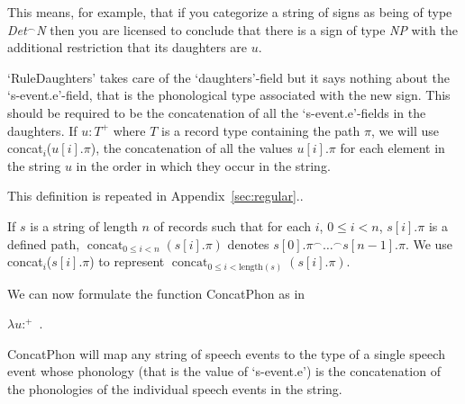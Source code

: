 
\begin{ex}
  \begin{prooftree}
  \end{prooftree}
  
\end{ex} 
This means, for example, that if you categorize a string of signs as
being of type \textit{Det}$^{\frown}$\textit{N} then you are licensed to conclude
that there is a sign of type \textit{NP} with the additional
restriction that its daughters are $u$.   

`RuleDaughters' takes care of the `daughters'-field but it says
nothing about the `s-event.e'-field, that is the phonological type
associated with the new sign.  This should be required to be the
concatenation of all the `s-event.e'-fields in the daughters. If
$u:T^+$ where $T$ is a record type containing the path $\pi$, we will
use concat$_i$($u[i].\pi$),
the concatenation of all the values $u[i].\pi$ for each element in the
string $u$ in the order in which they occur in the string.

\begin{shaded}
This
definition is repeated in
Appendix~\ref{sec:regular}.\label{pg:concat-i}.

If $s$ is a string of length $n$ of records such that for each $i$,
$0\leq i<n$, $s[i].\pi$ is a defined path, 
$\displaystyle\mathop{\mathrm{concat}}_{0\leq i<n}(s[i].\pi)$ denotes
$s[0].\pi^{\frown}\ldots^{\frown}s[n-1].\pi$.  We use
concat$_i$($s[i].\pi$) to represent
$\displaystyle\mathop{\mathrm{concat}}_{0\leq
  i<\mathrm{length}(s)}(s[i].\pi)$.
\end{shaded}

We can now
formulate the function ConcatPhon as in \nexteg{}
\begin{ex} 
$\lambda
u$:$^+$\
. \\
\hspace*{1em} 
\end{ex} 
ConcatPhon will map any string of speech events to the type of a
single speech event whose phonology (that is the value of `s-event.e')
is the concatenation of the phonologies of the individual speech
events in the string.

